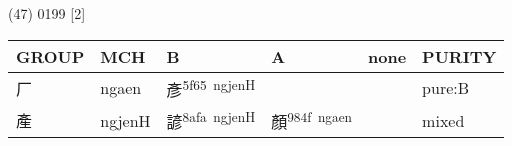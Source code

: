 \documentclass[14pt,a4paper]{scrartcl}
\begin{document}
(47) 0199 {[}2{]}

\begin{longtable}[c]{@{}llllll@{}}
\toprule
\begin{minipage}[b]{0.14\columnwidth}\raggedright\strut
GROUP
\strut\end{minipage} &
\begin{minipage}[b]{0.14\columnwidth}\raggedright\strut
MCH
\strut\end{minipage} &
\begin{minipage}[b]{0.14\columnwidth}\raggedright\strut
B
\strut\end{minipage} &
\begin{minipage}[b]{0.14\columnwidth}\raggedright\strut
A
\strut\end{minipage} &
\begin{minipage}[b]{0.14\columnwidth}\raggedright\strut
none
\strut\end{minipage} &
\begin{minipage}[b]{0.14\columnwidth}\raggedright\strut
PURITY
\strut\end{minipage}\tabularnewline
\midrule
\endhead
\begin{minipage}[t]{0.14\columnwidth}\raggedright\strut
厂
\strut\end{minipage} &
\begin{minipage}[t]{0.14\columnwidth}\raggedright\strut
ngaen
\strut\end{minipage} &
\begin{minipage}[t]{0.14\columnwidth}\raggedright\strut
彥\textsuperscript{5f65~ngjenH}
\strut\end{minipage} &
\begin{minipage}[t]{0.14\columnwidth}\raggedright\strut
\strut\end{minipage} &
\begin{minipage}[t]{0.14\columnwidth}\raggedright\strut
\strut\end{minipage} &
\begin{minipage}[t]{0.14\columnwidth}\raggedright\strut
pure:B
\strut\end{minipage}\tabularnewline
\begin{minipage}[t]{0.14\columnwidth}\raggedright\strut
產
\strut\end{minipage} &
\begin{minipage}[t]{0.14\columnwidth}\raggedright\strut
ngjenH
\strut\end{minipage} &
\begin{minipage}[t]{0.14\columnwidth}\raggedright\strut
諺\textsuperscript{8afa~ngjenH}
\strut\end{minipage} &
\begin{minipage}[t]{0.14\columnwidth}\raggedright\strut
顏\textsuperscript{984f~ngaen}
\strut\end{minipage} &
\begin{minipage}[t]{0.14\columnwidth}\raggedright\strut
\strut\end{minipage} &
\begin{minipage}[t]{0.14\columnwidth}\raggedright\strut
mixed
\strut\end{minipage}\tabularnewline
\bottomrule
\end{longtable}
\end{document}
